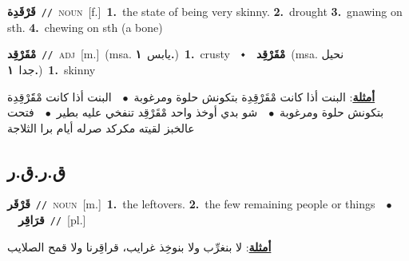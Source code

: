 \documentclass[10pt,a4paper,twoside]{article} %
\begin{document}
\begin{multicols}{2}
{\setlength\topsep{0pt}\textbf{\foreignlanguage{arabic}{قَرْقَدِة}}\ {\color{gray}\texttt{//}\color{black}}\ \textsc{noun}\ [f.]\ \textbf{1.}~the state of being very skinny.  \textbf{2.}~drought  \textbf{3.}~gnawing on sth.  \textbf{4.}~chewing on sth (a bone)\ } \vspace{2mm}

{\setlength\topsep{0pt}\textbf{\foreignlanguage{arabic}{مْقَرْقِد}}\ {\color{gray}\texttt{//}\color{black}}\ \textsc{adj}\ [m.]\ \color{gray}(msa. \foreignlanguage{arabic}{يابس}~\foreignlanguage{arabic}{\textbf{١.}})\color{black}\ \textbf{1.}~crusty\ \ $\smblkdiamond$\ \ \setlength\topsep{0pt}\textbf{\foreignlanguage{arabic}{مْقَرْقِد}}\ \color{gray}(msa. \foreignlanguage{arabic}{نحيل جدا}~\foreignlanguage{arabic}{\textbf{١.}})\color{black}\ \textbf{1.}~skinny\  \begin{flushright}\color{gray}\foreignlanguage{arabic}{\textbf{\underline{\foreignlanguage{arabic}{أمثلة}}}: البنت أذا كانت مْقَرْقِدِة بتكونش حلوة ومرغوبة\ $\bullet$\ \  البنت أذا كانت مْقََرْقِدِة بتكونش حلوة ومرغوبة\ $\bullet$\ \  شو بدي أوخذ واحد مْقَرْقِد تنفخي عليه بطير\ $\bullet$\ \  فتحت عالخبز لقيته مكركد صرله أيام برا الثلاجة}\end{flushright}\color{black}} \vspace{2mm}

\vspace{-3mm}
\subsection*{\color{blue}\foreignlanguage{arabic}{ق.ر.ق.ر}\color{blue}{}} 

{\setlength\topsep{0pt}\textbf{\foreignlanguage{arabic}{قَرْقَر}}\ {\color{gray}\texttt{//}\color{black}}\ \textsc{noun}\ [m.]\ \textbf{1.}~the leftovers.  \textbf{2.}~the few remaining people or things\ \ $\bullet$\ \ \setlength\topsep{0pt}\textbf{\foreignlanguage{arabic}{قرَاقِر}}\ {\color{gray}\texttt{//}\color{black}}\ [pl.]\  \begin{flushright}\color{gray}\foreignlanguage{arabic}{\textbf{\underline{\foreignlanguage{arabic}{أمثلة}}}: لا بنغرِّب ولا بنوخِذ غرايب، قراقِرنا ولا قمح الصلايب}\end{flushright}\color{black}} \vspace{2mm}


\end{multicols}
\end{document}
